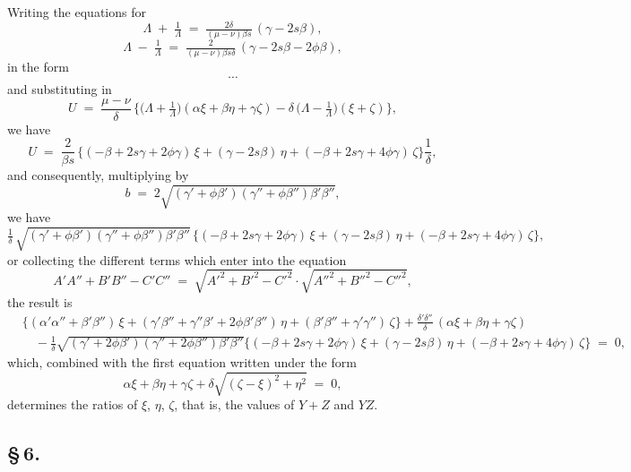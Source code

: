 \documentclass[11pt]{article}
\begin{document}
Writing the equations for
\[
\Lambda \;+\; \tfrac{1}{\Lambda} \;=\; \tfrac{2\delta}{(\mu - \nu)\beta s}\,(\gamma - 2s\beta),
\]
\[
\Lambda \;-\; \tfrac{1}{\Lambda} \;=\; \tfrac{2}{(\mu - \nu)\beta s\delta}\,(\gamma - 2s\beta - 2\phi\beta),
\]
in the form
\[
\cdots
\]
and substituting in
\[
U \;=\; \frac{\mu - \nu}{\delta}\,\bigl\{\bigl(\Lambda + \tfrac{1}{\Lambda}\bigr)(\alpha\xi + \beta\eta + \gamma\zeta) - \delta\,\bigl(\Lambda - \tfrac{1}{\Lambda}\bigr)(\xi + \zeta)\bigr\},
\]
we have
\[
U \;=\; \frac{2}{\beta s}\,\bigl\{(-\beta + 2s\gamma + 2\phi\gamma)\,\xi + (\gamma - 2s\beta)\,\eta + (-\beta + 2s\gamma + 4\phi\gamma)\,\zeta\bigr\}\frac{1}{\delta},
\]
and consequently, multiplying by
\[
b \;=\; 2\sqrt{(\gamma' + \phi\beta')(\gamma'' + \phi\beta'')\beta'\beta''},
\]
we have
\[
\tfrac{1}{\delta}\,\sqrt{(\gamma' + \phi\beta')(\gamma'' + \phi\beta'')\beta'\beta''}\,\bigl\{(-\beta + 2s\gamma + 2\phi\gamma)\,\xi + (\gamma - 2s\beta)\,\eta + (-\beta + 2s\gamma + 4\phi\gamma)\,\zeta\bigr\},
\]
or collecting the different terms which enter into the equation
\[
A'A'' + B'B'' - C'C'' \;=\; \sqrt{A'^{2} + B'^{2} - C'^{2}}\cdot\sqrt{A''^{2} + B''^{2} - C''^{2}},
\]
the result is
\begin{align*}
&\bigl\{(\alpha'\alpha'' + \beta'\beta'')\,\xi + (\gamma'\beta'' + \gamma''\beta' + 2\phi\beta'\beta'')\,\eta + (\beta'\beta'' + \gamma'\gamma'')\,\zeta\bigr\} + \tfrac{\delta'\delta''}{\delta}\,(\alpha\xi + \beta\eta + \gamma\zeta)\\
&\quad - \tfrac{1}{\delta}\sqrt{(\gamma' + 2\phi\beta')(\gamma'' + 2\phi\beta'')\beta'\beta''}\bigl\{(-\beta + 2s\gamma + 2\phi\gamma)\,\xi + (\gamma - 2s\beta)\,\eta + (-\beta + 2s\gamma + 4\phi\gamma)\,\zeta\bigr\} \;=\; 0,
\end{align*}
which, combined with the first equation written under the form
\[
\alpha\xi + \beta\eta + \gamma\zeta + \delta\sqrt{(\zeta - \xi)^{2} + \eta^{2}} \;=\; 0,
\]
determines the ratios of $\xi$, $\eta$, $\zeta$, that is, the values of $Y + Z$ and $YZ$.

\bigskip

\subsection*{\S\,6.}
\end{document}
